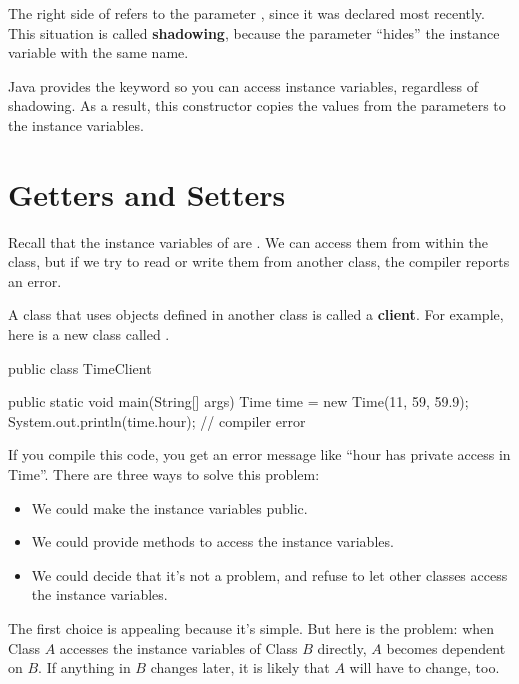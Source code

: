 
The right side of  refers to the parameter , since it was declared most recently.
This situation is called {\bf shadowing}, because the parameter ``hides'' the instance variable with the same name.

Java provides the keyword  so you can access instance variables, regardless of shadowing.
As a result, this constructor copies the values from the parameters to the instance variables.


\section{Getters and Setters}

Recall that the instance variables of  are .
We can access them from within the  class, but if we try to read or write them from another class, the compiler reports an error.


A class that uses objects defined in another class is called a {\bf client}.
For example, here is a new class called .


\begin{code}
public class TimeClient {

    public static void main(String[] args) {
        Time time = new Time(11, 59, 59.9);
        System.out.println(time.hour);      // compiler error
    }
}
\end{code}

If you compile this code, you get an error message like ``hour has private access in Time''.
There are three ways to solve this problem:

\begin{itemize}

\item We could make the instance variables public.

\item We could provide methods to access the instance variables.

\item We could decide that it's not a problem, and refuse to let other classes access the instance variables.

\end{itemize}

The first choice is appealing because it's simple.
But here is the problem: when Class $A$ accesses the instance variables of Class $B$ directly, $A$ becomes dependent on $B$.
If anything in $B$ changes later, it is likely that $A$ will have to change, too.

